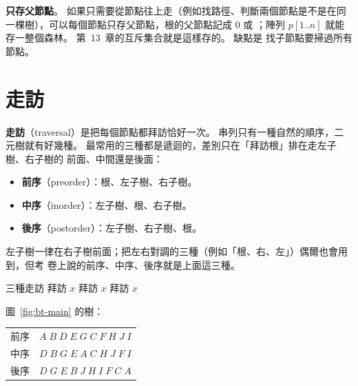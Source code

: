 \textbf{只存父節點}。 如果只需要從節點往上走（例如找路徑、判斷兩個節點是不是在同
一棵樹），可以每個節點只存父節點，根的父節點記成 $0$ 或 \NIL；陣列
$p[1..n]$ 就能存一整個森林。 第~13~章的互斥集合就是這樣存的。 缺點是
找子節點要掃過所有節點。

\section{走訪}
\label{sec:bt-walk}

\textbf{走訪}（traversal）是把每個節點都拜訪恰好一次。 串列只有一種自然的順序，二
元樹就有好幾種。 最常用的三種都是遞迴的，差別只在「拜訪根」排在走左子樹、右子樹的
前面、中間還是後面：

\begin{itemize}
\item \textbf{前序}（preorder）：根、左子樹、右子樹。
\item \textbf{中序}（inorder）：左子樹、根、右子樹。
\item \textbf{後序}（postorder）：左子樹、右子樹、根。
\end{itemize}

左子樹一律在右子樹前面；把左右對調的三種（例如「根、右、左」）偶爾也會用到，但考
卷上說的前序、中序、後序就是上面這三種。

\begin{pseudo}[label=alg:bt-walks]{三種走訪}
        \State 拜訪 $x$
        \State {}
        \State {}
    \EndIf
\EndProcedure
\Statex
{}
        \State {}
        \State 拜訪 $x$
        \State {}
    \EndIf
\EndProcedure
\Statex
{}
        \State {}
        \State {}
        \State 拜訪 $x$
    \EndIf
\EndProcedure
\end{pseudo}

圖~\ref{fig:bt-main} 的樹：
\begin{center}
\begin{tabular}{ll}
\toprule
前序 & $A\;B\;D\;E\;G\;C\;F\;H\;J\;I$ \\
中序 & $D\;B\;G\;E\;A\;C\;H\;J\;F\;I$ \\
後序 & $D\;G\;E\;B\;J\;H\;I\;F\;C\;A$ \\
\bottomrule
\end{tabular}
\end{center}


